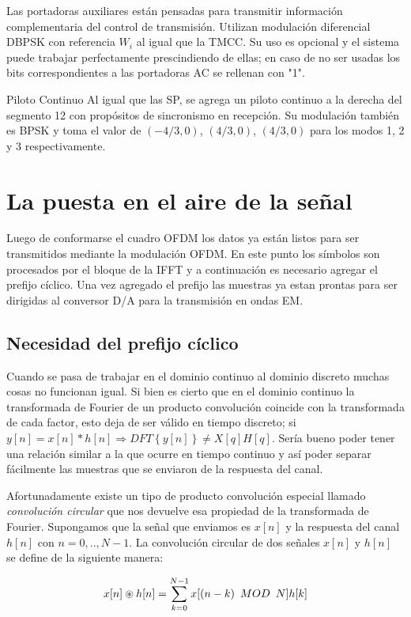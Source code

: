 Las portadoras auxiliares están pensadas para transmitir información complementaria del control de transmisión. Utilizan modulación diferencial DBPSK con referencia $W_i$ al igual que la TMCC. Su uso es opcional y el sistema puede trabajar perfectamente prescindiendo de ellas; en caso de no ser usadas los bits correspondientes a las portadoras AC se rellenan con "1".

Piloto Continuo
Al igual que las SP, se agrega un piloto continuo a la derecha del segmento 12 con propósitos de sincronismo en recepción. Su modulación también es BPSK y toma el valor de $(-4/3, 0)$, $(4/3, 0)$, $(4/3, 0)$ para los modos 1, 2 y 3 respectivamente.


\section{La puesta en el aire de la señal}

Luego de conformarse el cuadro OFDM los datos ya están listos para ser transmitidos mediante la modulación OFDM. En este punto los símbolos son procesados por el bloque de la IFFT y a continuación es necesario agregar el prefijo cíclico. Una vez agregado el prefijo las muestras ya estan prontas para ser dirigidas al conversor D/A para la transmisión en ondas EM.

\subsection{Necesidad del prefijo cíclico}

Cuando se pasa de trabajar en el dominio continuo al dominio discreto muchas cosas no funcionan igual. Si bien es cierto que en el dominio continuo la transformada de Fourier de un producto convolución coincide con la transformada de cada factor, esto deja de ser válido en tiempo discreto; si $y[n] = x[n]\ast h[n] \Rightarrow DFT \left\{ y[n] \right\} \neq X[q]H[q]$.
Sería bueno poder tener una relación similar a la que ocurre en tiempo continuo y así poder separar fácilmente las muestras que se enviaron de la respuesta del canal. 

Afortunadamente existe un tipo de producto convolución especial llamado \textit{convolución circular} que nos devuelve esa propiedad de la transformada de Fourier.
Supongamos que la señal que enviamos es $x[n]$ y la respuesta del canal $h[n]$ con $n = 0,..,N-1$. La convolución circular de dos señales $x[n]$ y $h[n]$ se define de la siguiente manera:

\begin{equation}
x[n] \circledast h[n] = \sum_{k = 0}^{N-1} x[(n-k) \enskip MOD \enskip N]h[k]
\end{equation} 

